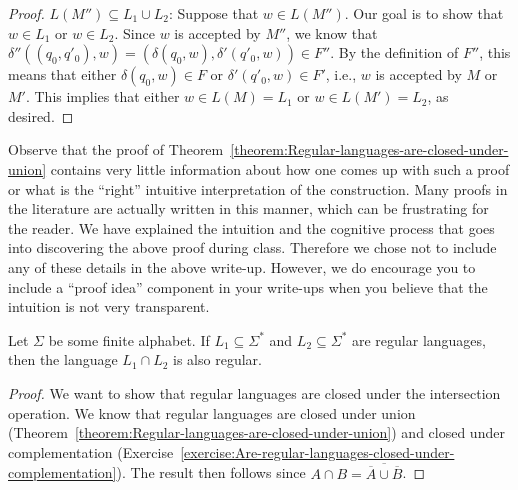 \begin{flex}
\begin{proof}
$L(M'') \subseteq L_1 \cup L_2$: 
Suppose that $w \in L(M'')$. 
Our goal is to show that $w \in L_1$ or  $w \in L_2$. 
Since $w$ is accepted by $M''$, we know that $\delta''((q_0, q'_0), w) = (\delta(q_0,w), \delta'(q'_0, w)) \in F''$. 
By the definition of $F''$, this means that either $\delta(q_0, w) \in F$ or $\delta'(q'_0, w) \in F'$, i.e., $w$ is accepted by $M$ or $M'$. 
This implies that either $w \in L(M) = L_1$ or $w \in L(M') = L_2$, as desired.  

\end{proof}
\end{flex}

\begin{note}
\label{note:On-proof-write-up}
Observe that the proof of Theorem~\ref{theorem:Regular-languages-are-closed-under-union} contains very little information about how one comes up with such a proof or what is the ``right'' intuitive interpretation of the construction. 
Many proofs in the literature are actually written in this manner, which can be frustrating for the reader. 
We have explained the intuition and the cognitive process that goes into discovering the above proof during class. 
Therefore we chose not to include any of these details in the above write-up. 
However, we do encourage you to include a ``proof idea'' component in your write-ups when you believe that the intuition is not very transparent. 

\end{note}

\begin{flex}
\label{grp:corollary:Regular-languages-are-closed-under-intersection}

\begin{corollary}
\label{corollary:Regular-languages-are-closed-under-intersection}
Let $\Sigma$ be some finite alphabet. 
If $L_1 \subseteq \Sigma^*$ and $L_2 \subseteq \Sigma^*$ are regular languages, then the language $L_1 \cap L_2$ is also regular.

\end{corollary}

\begin{proof}
\label{prf:deterministic-finite-automata::want}
We want to show that regular languages are closed under the intersection operation. We know that regular languages are closed under union (Theorem~\ref{theorem:Regular-languages-are-closed-under-union}) and closed under complementation (Exercise~\ref{exercise:Are-regular-languages-closed-under-complementation}). 
The result then follows since $A \cap B = \overline{\overline{A} \cup \overline{B}}$. 

\end{proof}
\end{flex}

